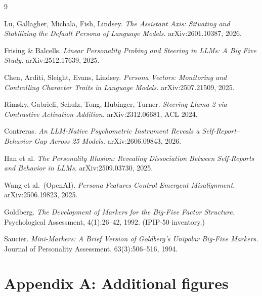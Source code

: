 \documentclass[11pt]{article}
\begin{document}
\clearpage
{}
{}
\begin{thebibliography}{9}\small

Lu, Gallagher, Michala, Fish, Lindsey.
\newblock \emph{The Assistant Axis: Situating and Stabilizing the Default
Persona of Language Models.}
\newblock arXiv:2601.10387, 2026.

Frising \& Balcells.
\newblock \emph{Linear Personality Probing and Steering in LLMs: A Big Five
Study.}
\newblock arXiv:2512.17639, 2025.

Chen, Arditi, Sleight, Evans, Lindsey.
\newblock \emph{Persona Vectors: Monitoring and Controlling Character Traits
in Language Models.}
\newblock arXiv:2507.21509, 2025.

Rimsky, Gabrieli, Schulz, Tong, Hubinger, Turner.
\newblock \emph{Steering Llama 2 via Contrastive Activation Addition.}
\newblock arXiv:2312.06681, ACL 2024.

Contreras.
\newblock \emph{An LLM-Native Psychometric Instrument Reveals a
Self-Report--Behavior Gap Across 25 Models.}
\newblock arXiv:2606.09843, 2026.

Han et al.
\newblock \emph{The Personality Illusion: Revealing Dissociation Between
Self-Reports and Behavior in LLMs.}
\newblock arXiv:2509.03730, 2025.

Wang et al.\ (OpenAI).
\newblock \emph{Persona Features Control Emergent Misalignment.}
\newblock arXiv:2506.19823, 2025.

Goldberg.
\newblock \emph{The Development of Markers for the Big-Five Factor
Structure.}
\newblock Psychological Assessment, 4(1):26--42, 1992. (IPIP-50 inventory.)

Saucier.
\newblock \emph{Mini-Markers: A Brief Version of Goldberg's Unipolar Big-Five
Markers.}
\newblock Journal of Personality Assessment, 63(3):506--516, 1994.

\end{thebibliography}

\clearpage
\appendix
\renewcommand{\thefigure}{A.\arabic{figure}}
\setcounter{figure}{0}
{}
\section*{Appendix A: Additional figures}\label{app:figs}
\end{document}

